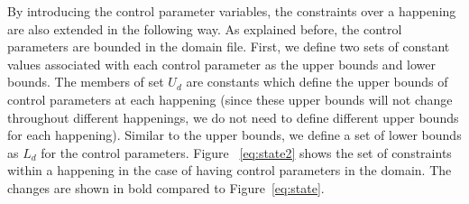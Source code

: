 By introducing the control parameter variables, the constraints over a happening are also extended in the following way. As explained before, the control parameters are bounded in the domain file. First, we define two sets of constant values associated with each control parameter as the upper bounds and lower bounds. The members of set $U_d$ are constants which define the upper bounds of control parameters at each happening (since these upper bounds will not change throughout different happenings, we do not need to define different upper bounds for each happening). Similar to the upper bounds, we define a set of lower bounds as $L_d$ for the control parameters. Figure ~\ref{eq:state2} shows the set of constraints within a happening in the case of having control parameters in the domain. The changes are shown in bold compared to Figure~\ref{eq:state}.

